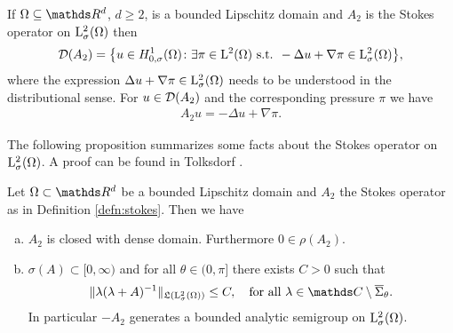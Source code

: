 \begin{thm}
  \label{thm:stokesOperatorL2}
  If $\Omega \subseteq \R^d$, $d \geq 2$, is a bounded Lipschitz domain and $A_2$ is the Stokes operator on $\mathrm{L}^2_\sigma(\Omega)$ then
  \begin{align*}
    \mathcal{D}(A_2) = \big\{ u \in H^1_{0,\sigma}(\Omega) \colon \exists \pi \in \mathrm{L}^2(\Omega) \text{ s.t. } -\Delta u + \nabla \pi \in \mathrm{L}^2_\sigma(\Omega) \big\},
  \end{align*}
  where the expression $\Delta u + \nabla \pi \in\mathrm{L}^2_\sigma(\Omega)$ needs to be understood in the distributional sense.
  For $u \in \mathcal{D}(A_2)$ and the corresponding pressure $\pi$ we have
  \begin{align*}
    A_2 u = -\Delta u + \nabla \pi.
  \end{align*}
\end{thm}

The following proposition summarizes some facts about the Stokes operator on $\mathrm{L}^2_\sigma(\Omega)$. A proof can be found in Tolksdorf \cite{tolksdorf}.

\begin{prop}
  \label{prop:stokesOperatorL2}
  Let $\Omega \subset \R^d$ be a bounded Lipschitz domain and $A_2$ the Stokes operator as in Definition \ref{defn:stokes}. Then we have
  \begin{enumerate}[a)]
    \item $A_2$ is closed with dense domain. Furthermore $0 \in \rho(A_2)$.
    \item $\sigma(A) \subset [0,\infty)$ and for all $\theta \in (0,\pi]$ there exists $C > 0$ such that
      \begin{align}
        \label{eq:resolventEstimateL2}
        \| \lambda(\lambda + A)^{-1} \|_{\Li(\Ell^2_\sigma(\Omega))} \leq C, \quad\text{for all } \lambda \in \C \setminus \overline \Sigma_\theta.
      \end{align}
      In particular $-A_2$ generates a bounded analytic semigroup on $\mathrm{L}^2_\sigma(\Omega)$.
  \end{enumerate}
\end{prop}

